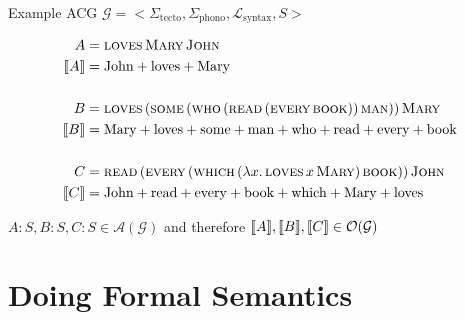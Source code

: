 \documentclass{beamer}
\begin{document}
\begin{frame}{Example ACG}
  $\mathcal{G} = \mathopen{<}\Sigma_{\mathrm{tecto}},
  \Sigma_{\mathrm{phono}}, \mathcal{L}_{\mathrm{syntax}}, S \mathclose{>}$
  
  
  \begin{align*}
  A &= \textsc{loves}\,\textsc{Mary}\,\textsc{John} \\
  \llbracket A \rrbracket &= \mathrm{John} + \mathrm{loves} + \mathrm{Mary} \\
  \\
  B &= \textsc{loves}\,(\textsc{some}\,(\textsc{who}\,(\textsc{read}\,(\textsc{every}\,\textsc{book}))\,\textsc{man}))\,\textsc{Mary} \\
  \llbracket B \rrbracket &= \mathrm{Mary} + \mathrm{loves} + \mathrm{some} + \mathrm{man} + \mathrm{who} + \mathrm{read} + \mathrm{every} + \mathrm{book} \\
  \\
  C &= \textsc{read}\,(\textsc{every}\,(\textsc{which}\,(\lambda x.\, \textsc{loves}\,x\,\textsc{Mary})\,\textsc{book}))\,\textsc{John} \\
  \llbracket C \rrbracket &= \mathrm{John} + \mathrm{read} + \mathrm{every} + \mathrm{book} + \mathrm{which} + \mathrm{Mary} + \mathrm{loves} \\
  \end{align*}

  $A : S, B : S, C : S \in \mathcal{A(G)}$ and therefore $\llbracket A \rrbracket, \llbracket B \rrbracket,
  \llbracket C \rrbracket \in \mathcal{O(G)}$
\end{frame}



\section{Doing Formal Semantics}
\end{document}
